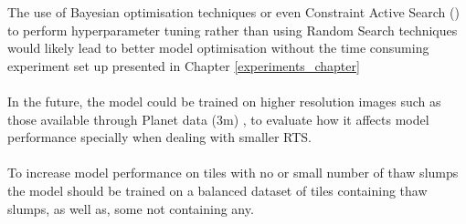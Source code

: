 The use of Bayesian optimisation techniques or even Constraint Active Search (\cite{pmlr-v139-malkomes21a}) to perform hyperparameter tuning rather than using Random Search techniques would likely lead to better model optimisation without the time consuming experiment set up presented in Chapter \ref{experiments_chapter}

\paragraph{}
In the future, the model could be trained on higher resolution images such as those available through Planet data (3m) , to evaluate how it affects model performance specially when dealing with smaller RTS.

\paragraph{}
To increase model performance on tiles with no or small number of thaw slumps the model should be trained on a balanced dataset of tiles containing thaw slumps, as well as, some not containing any.
